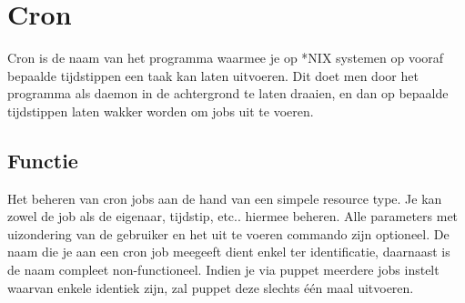 \section{Cron}
Cron is de naam van het programma waarmee je op *NIX systemen op vooraf bepaalde tijdstippen een taak kan laten uitvoeren. Dit doet men door het programma als daemon in de achtergrond te laten draaien, en dan op bepaalde tijdstippen laten wakker worden om jobs uit te voeren.

\subsection{Functie}
Het beheren van cron jobs aan de hand van een simpele resource type. Je kan zowel de job als de eigenaar, tijdstip, etc.. hiermee beheren. Alle parameters met uizondering van de gebruiker en het uit te voeren commando zijn optioneel. De naam die je aan een cron job meegeeft dient enkel ter identificatie, daarnaast is de naam compleet non-functioneel. Indien je via puppet meerdere jobs instelt waarvan enkele identiek zijn, zal puppet deze slechts \'{e}\'{e}n maal uitvoeren.

